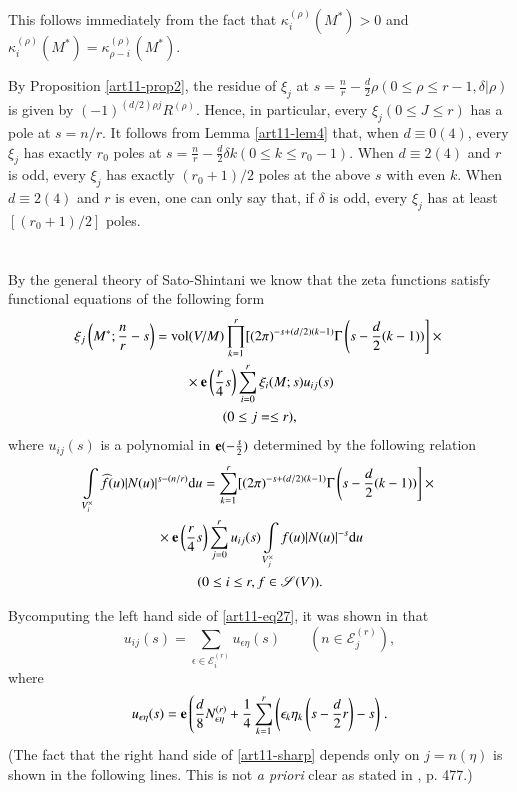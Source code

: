 This follows immediately from the fact that $\kappa^{(\rho)}_{i}(M^{*})>0$ and $\kappa^{(\rho)}_{i}(M^{*})=\kappa^{(\rho)}_{\rho-i}(M^{*})$.

By Proposition \ref{art11-prop2}, the residue of $\xi_{j}$ at $s=\frac{n}{r}-\frac{d}{2}\rho(0\leq \rho\leq r-1,\delta|\rho)$ is given by $(-1)^{(d/2)\rho j}R^{(\rho)}$. Hence, in particular, every $\xi_{j}(0\leq J\leq r)$ has a pole at $s=n/r$. It follows from Lemma \ref{art11-lem4} that, when $d\equiv 0(4)$, every $\xi_{j}$ has exactly $r_{0}$ poles at $s=\frac{n}{r}-\frac{d}{2}\delta k(0\leq k\leq r_{0}-1)$. When $d\equiv 2(4)$ and $r$ is odd, every $\xi_{j}$ has exactly $(r_{0}+1)/2$ poles at the above $s$ with even $k$. When $d\equiv 2(4)$ and $r$ is even, one can only say that, if $\delta$ is odd, every $\xi_{j}$ has at least $[(r_{0}+1)/2]$ poles.

\section{}\label{art11-sec6}
By the general theory of Sato-Shintani we know that the zeta functions satisfy functional equations of the following form
\begin{gather}
\xi_{j}\left(M^{*};\frac{n}{r}-s\right)=\text{vol}(V/M)\prod\limits^{r}_{k=1}[(2\pi)^{-s+(d/2)(k-1)}\Gamma\left(s-\dfrac{d}{2}(k-1))\right]\times{}\label{art11-eq26}\\
{}\times \mathbf{e} \left(\dfrac{r}{4}s\right)\sum\limits^{r}_{i=0}\xi_{i}(M;s)u_{ij}(s)\notag\\
(0\leq j=\leq r),\notag
\end{gather}
where $u_{ij}(s)$ is a polynomial in $\mathbf{e}(-\frac{s}{2})$ determined by the following relation 
\begin{gather}
\int\limits_{V^{\times}_{i}}\widehat{f}(u)|N(u)|^{s-(n/r)}\mathrm{d} u=\sum\limits^{r}_{k=1}[(2\pi)^{-s+(d/2)(k-1)}\Gamma\left(s-\dfrac{d}{2}(k-1))\right]\times{}\label{art11-eq27}\\
{}\times \mathbf{e} \left(\dfrac{r}{4}s\right)\sum\limits^{r}_{j=0}u_{ij}(s)\int\limits_{V^{\times}_{j}}f(u)|N(u)|^{-s}\mathrm{d} u\notag\\
(0\leq i\leq r, f\in \mathscr{S}(V)).\notag
\end{gather}

By\pageoriginale computing the left hand side of \eqref{art11-eq27}, it was shown in \cite{art11-keySF} that
\begin{equation*}
u_{ij}(s)=\sum\limits_{\epsilon\in \mathscr{E}^{(r)}_{i}}u_{\epsilon\eta}(s)\qquad (n\in \mathscr{E}^{(r)}_{j}),\tag{$\sharp$}\label{art11-sharp}
\end{equation*}
where
$$
u_{\epsilon\eta}(s)=\mathbf{e}\left(\frac{d}{8}N^{(r)}_{\epsilon\eta}+\frac{1}{4}\sum\limits^{r}_{k=1}\left(\epsilon_{k}\eta_{k}\left(s-\dfrac{d}{2}r\right)-s\right)\right..
$$
(The fact that the right hand side of \eqref{art11-sharp} depends only on $j=n(\eta)$ is shown in the following lines. This is not {\em a priori} clear as stated in \cite{art11-keySF}, p. 477.)

